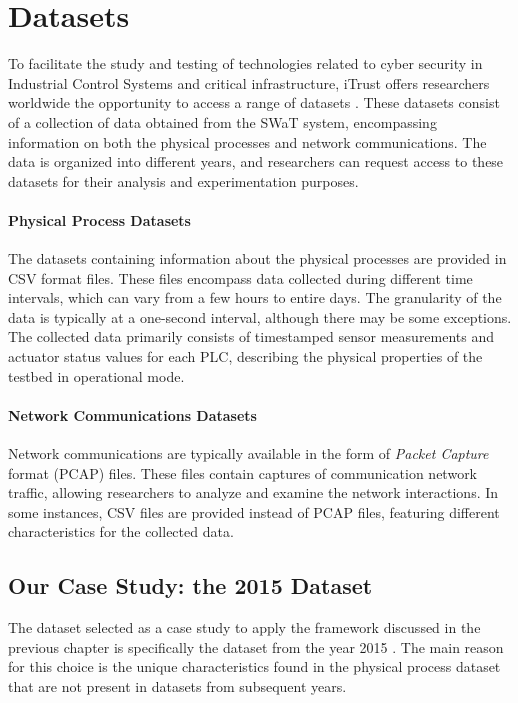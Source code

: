 \section{Datasets}
\label{sec:5_swat_datasets}

To facilitate the study and testing of technologies related to cyber security in Industrial Control Systems and critical infrastructure, iTrust offers researchers worldwide the opportunity to access a range of datasets \cite{swat_datasets}. These datasets consist of a collection of data obtained from the SWaT system, encompassing information on both the physical processes and network communications. The data is organized into different years, and researchers can request access to these datasets for their analysis and experimentation purposes.

\bigskip
\paragraph{Physical Process Datasets}
The datasets containing information about the physical processes are provided in CSV format files. These files encompass data collected during different time intervals, which can vary from a few hours to entire days. The granularity of the data is typically at a one-second interval, although there may be some exceptions. The collected data primarily consists of timestamped sensor measurements and actuator status values for each PLC, describing the physical properties of the testbed in operational mode.

\paragraph{Network Communications Datasets}
Network communications are typically available in the form of \textit{Packet Capture} format (PCAP) files. These files contain captures of communication network traffic, allowing researchers to analyze and examine the network interactions. In some instances, CSV files are provided instead of PCAP files, featuring different characteristics for the collected data.

\subsection{Our Case Study: the 2015 Dataset}
\label{subsec:5_2015_datasets}
The dataset selected as a case study to apply the framework discussed in the previous chapter is specifically the dataset from the year 2015 \cite{swat_dataset2015}. The main reason for this choice is the unique characteristics found in the physical process dataset that are not present in datasets from subsequent years.

